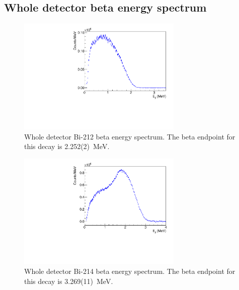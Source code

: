 \subsection{Whole detector beta energy spectrum}
\begin{figure}[!h]
\centering
\includegraphics[width=0.7\textwidth]{figures/PubBiPo212BetaE.pdf}
\caption{\label{fig:BetaE212}Whole detector Bi-212 beta energy spectrum. The beta endpoint for this decay is 2.252(2)~MeV.}
\end{figure}
\begin{figure}[!h]
\centering
\includegraphics[width=0.7\textwidth]{figures/PubBiPo214BetaE.pdf}
\caption{\label{fig:BetaE214}Whole detector Bi-214 beta energy spectrum. The beta endpoint for this decay is 3.269(11)~MeV.}
\end{figure}
\clearpage
\newpage
